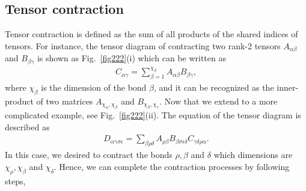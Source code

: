 %


\subsection{Tensor contraction}

Tensor contraction is defined as the sum of all products of the shared indices of tensors. For instance, the tensor diagram of contracting two rank-2 tensors $A_{\alpha \beta}$ and $B_{\beta \gamma}$ is shown as Fig.~\ref{fig222}(i) which can be written as
\begin{align}
	C_{\alpha \gamma}=\sum\limits_{\beta = 1}^{\chi_{\beta}}{A_{\alpha \beta}B_{\beta \gamma}},
\end{align}
where $\chi_{\beta}$ is the dimension of the bond $\beta$, and it can be recognized as the inner-product of two matrices $A_{\chi_{\alpha}, \chi_{\beta}}$ and $B_{\chi_{\beta}, \chi_{\gamma}}$. Now that we extend to a more complicated example, see Fig.~\ref{fig222}(ii). The equation of the tensor diagram is described as
\begin{align}
	D_{\alpha \gamma \sigma \epsilon}=\sum_{\beta \rho \delta}{A_{\rho \beta}B_{\beta \sigma \epsilon \delta}C_{\gamma \delta \rho \alpha}}.
\end{align}
In this case, we desired to contract the bonds $\rho,\beta$ and $\delta$ which dimensions are $\chi_{\rho}, \chi_{\beta}$ and $\chi_{\delta}$. Hence, we can complete the contraction processes by following steps,

